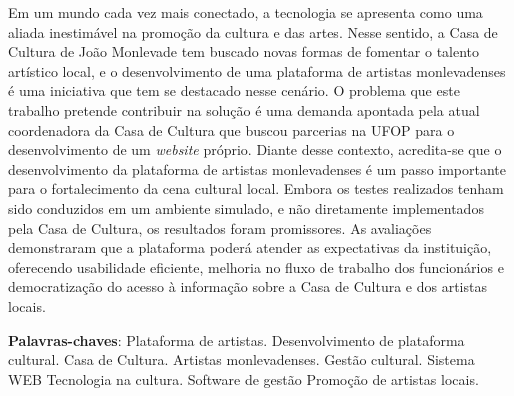\setlength{\absparsep}{18pt} %

\begin{resumo}
Em um mundo cada vez mais conectado, a tecnologia se apresenta como uma aliada inestimável na promoção da cultura e das artes. Nesse sentido, a Casa de Cultura de João Monlevade tem buscado novas formas de fomentar o talento artístico local, e o desenvolvimento de uma plataforma de artistas monlevadenses é uma iniciativa que tem se destacado nesse cenário. O problema que este trabalho pretende contribuir na solução é uma demanda apontada pela atual coordenadora da Casa de Cultura que buscou parcerias na UFOP para o desenvolvimento de um \textit{website} próprio. Diante desse contexto, acredita-se que o desenvolvimento da plataforma de artistas monlevadenses é um passo importante para o fortalecimento da cena cultural local. Embora os testes realizados tenham sido conduzidos em um ambiente simulado, e não diretamente implementados pela Casa de Cultura, os resultados foram promissores. As avaliações demonstraram que a plataforma poderá atender as expectativas da instituição, oferecendo usabilidade eficiente, melhoria no fluxo de trabalho dos funcionários e democratização do acesso à informação sobre a Casa de Cultura e dos artistas locais.


 \textbf{Palavras-chaves}:     
    Plataforma de artistas.
    Desenvolvimento de plataforma cultural.
    Casa de Cultura.
    Artistas monlevadenses.
    Gestão cultural.
    Sistema WEB
    Tecnologia na cultura.
    Software de gestão
    Promoção de artistas locais.
\end{resumo}
